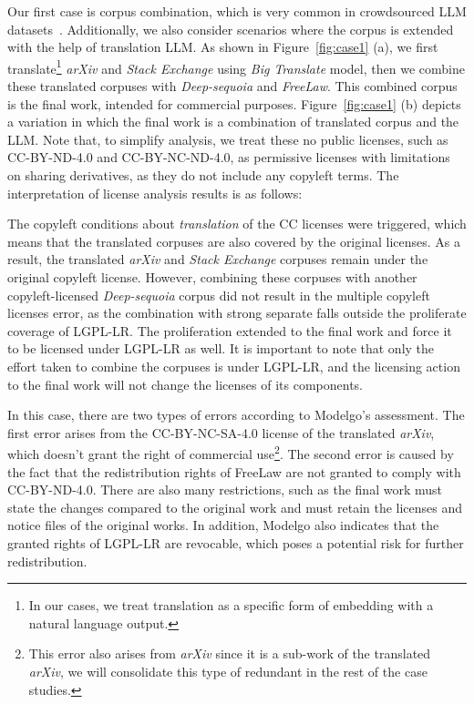 Our first case is corpus combination, which is very common in crowdsourced LLM datasets~\cite{gao2020the, penedo2023refinedweb, kocetkov2023stack}. 
Additionally, we also consider scenarios where the corpus is extended with the help of translation LLM.
As shown in Figure~\ref{fig:case1} (a), we first translate\footnote{In our cases, we treat translation as a specific form of embedding with a natural language output.} \textit{arXiv} and \textit{Stack Exchange} using \textit{Big Translate} model, then we combine these translated corpuses with \textit{Deep-sequoia} and \textit{FreeLaw}.
This combined corpus is the final work, intended for commercial purposes.
Figure~\ref{fig:case1} (b) depicts a variation in which the final work is a combination of translated corpus and the LLM.
Note that, to simplify analysis, we treat these no public licenses, such as CC-BY-ND-4.0 and CC-BY-NC-ND-4.0, as permissive licenses with limitations on sharing derivatives, as they do not include any copyleft terms.
The interpretation of license analysis results is as follows:

 The copyleft conditions about \textit{translation} of the CC licenses were triggered, which means that the translated corpuses are also covered by the original licenses.
As a result, the translated \textit{arXiv} and \textit{Stack Exchange} corpuses remain under the original copyleft license. 
However, combining these corpuses with another copyleft-licensed \textit{Deep-sequoia} corpus did not result in the multiple copyleft licenses error, as the combination with strong separate falls outside the proliferate coverage of LGPL-LR.
The proliferation extended to the final work and force it to be licensed under LGPL-LR as well.
It is important to note that only the effort taken to combine the corpuses is under LGPL-LR, and the licensing action to the final work will not change the licenses of its components.

In this case, there are two types of errors according to Modelgo's assessment.
The first error arises from the CC-BY-NC-SA-4.0 license of the translated \textit{arXiv}, which doesn't grant the right of commercial use\footnote{This error also arises from \textit{arXiv} since it is a sub-work of the translated \textit{arXiv}, we will consolidate this type of redundant in the rest of the case studies.}. 
The second error is caused by the fact that the redistribution rights of FreeLaw are not granted to comply with CC-BY-ND-4.0.
There are also many restrictions, such as the final work must state the changes compared to the original work and must retain the licenses and notice files of the original works.
In addition, Modelgo also indicates that the granted rights of LGPL-LR are revocable, which poses a potential risk for further redistribution.

